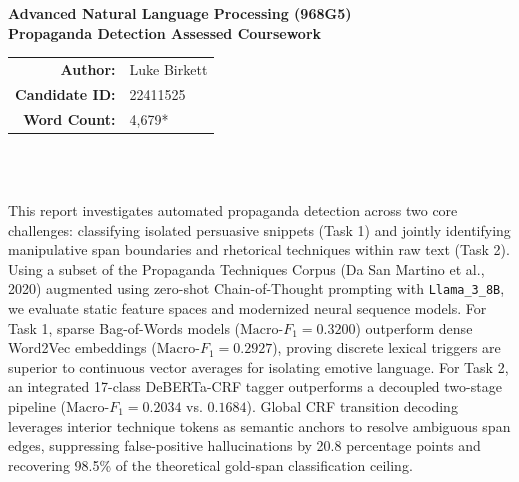 \documentclass[12pt, a4paper]{article}
\begin{document}
\begin{titlepage}
    \centering
    \vspace*{0.5cm}
    
    {\Large \textbf{Advanced Natural Language Processing (968G5)}}\\[0.3cm]
    {\large \textbf{Propaganda Detection Assessed Coursework}}\\[0.1cm]
    
    \begin{tabular}{r l}
        \textbf{Author:} & Luke Birkett \\
        \textbf{Candidate ID:} & 22411525 \\
        \textbf{Word Count:} & 4,679* \\
    \end{tabular}\\[0.5cm]
    
    \begin{minipage}{0.92\textwidth}
        \small
        \textbf{\abstractname}\\[0.3em]
        This report investigates automated propaganda detection across two core challenges: classifying isolated persuasive snippets (Task 1) and jointly identifying manipulative span boundaries and rhetorical techniques within raw text (Task 2). Using a subset of the Propaganda Techniques Corpus (Da San Martino et al., 2020) augmented using zero-shot Chain-of-Thought prompting with \texttt{Llama\_3\_8B}, we evaluate static feature spaces and modernized neural sequence models. For Task 1, sparse Bag-of-Words models ($\text{Macro-}F_1 = 0.3200$) outperform dense Word2Vec embeddings ($\text{Macro-}F_1 = 0.2927$), proving discrete lexical triggers are superior to continuous vector averages for isolating emotive language. For Task 2, an integrated 17-class DeBERTa-CRF tagger outperforms a decoupled two-stage pipeline ($\text{Macro-}F_1 = 0.2034$ vs. $0.1684$). Global CRF transition decoding leverages interior technique tokens as semantic anchors to resolve ambiguous span edges, suppressing false-positive hallucinations by 20.8 percentage points and recovering 98.5\% of the theoretical gold-span classification ceiling.
    \end{minipage}\\[1cm]
    

\end{titlepage}
\end{document}
